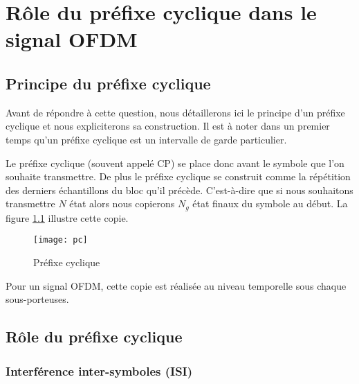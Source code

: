 \chapter{Rôle du préfixe cyclique dans le signal OFDM}

\section{Principe du préfixe cyclique}

Avant de répondre à cette question, nous détaillerons ici le principe d'un
préfixe cyclique et nous expliciterons sa construction. Il est à noter dans un
premier temps qu'un préfixe cyclique est un intervalle de garde
particulier. ~\\


Le préfixe cyclique (souvent appelé CP) se place donc avant le symbole que l'on
souhaite transmettre. De plus le préfixe cyclique se construit comme la
répétition des derniers échantillons du bloc qu'il précède. C'est-à-dire que si
nous souhaitons transmettre $N$ état alors nous copierons $N_g$ état finaux du
symbole au début. La figure \ref{fig:PC} illustre cette copie.

\begin{figure}[!h]
  \centering
  \texttt{[image: pc]}
  \caption{Préfixe cyclique} %
  \label{fig:PC}
\end{figure}

Pour un signal OFDM, cette copie est réalisée au niveau temporelle sous chaque
sous-porteuses.

\section{Rôle du préfixe cyclique}

\subsection{Interférence inter-symboles (ISI)}
\label{sec:ISI}






